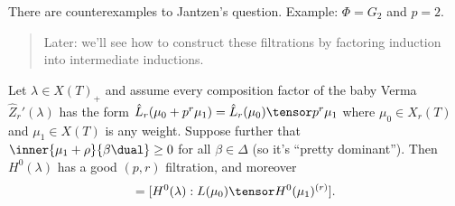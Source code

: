 \begin{proposition}

There are counterexamples to Jantzen's question. Example: \(\Phi = G_2\)
and \(p=2\).

\end{proposition}

\begin{quote}
Later: we'll see how to construct these filtrations by factoring
induction into intermediate inductions.
\end{quote}

\begin{theorem}[?]

Let \(\lambda \in X(T)_+\) and assume every composition factor of the
baby Verma \(\hat{Z}_r'(\lambda)\) has the form
\(\hat{L}_r(\mu_0 + p^r \mu_1) = \hat{L}_r(\mu_0) \tensor p^r \mu_1\)
where \(\mu_0\in X_r(T)\) and \(\mu_1\in X(T)\) is any weight. Suppose
further that \(\inner{\mu_1 + \rho}{\beta\dual}\geq 0\) for all
\(\beta\in \Delta\) (so it's ``pretty dominant''). Then \(H^0(\lambda)\)
has a good \((p, r)\) filtration, and moreover
\begin{align*}  
[ \hat{Z}_r'(\lambda) : \hat{L}_r(\mu_0) \tensor p^r \mu_1 ]
= [ H^0(\lambda) : L(\mu_0) \tensor H^0(\mu_1)^{(r)} ]
.\end{align*}

\end{theorem}

